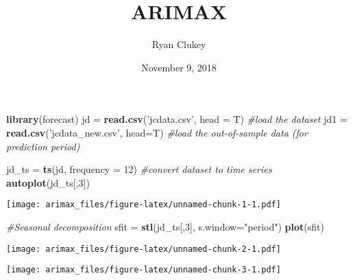 \documentclass[]{article}
\title{ARIMAX}
\author{Ryan Clukey}
\date{November 9, 2018}
\newenvironment{Shaded}{\begin{snugshade}}{\end{snugshade}}
\newcommand{\KeywordTok}[1]{\textcolor[rgb]{0.13,0.29,0.53}{\textbf{#1}}}
\newcommand{\DataTypeTok}[1]{\textcolor[rgb]{0.13,0.29,0.53}{#1}}
\newcommand{\DecValTok}[1]{\textcolor[rgb]{0.00,0.00,0.81}{#1}}
\newcommand{\StringTok}[1]{\textcolor[rgb]{0.31,0.60,0.02}{#1}}
\newcommand{\CommentTok}[1]{\textcolor[rgb]{0.56,0.35,0.01}{\textit{#1}}}
\newcommand{\OperatorTok}[1]{\textcolor[rgb]{0.81,0.36,0.00}{\textbf{#1}}}
\newcommand{\NormalTok}[1]{#1}
\begin{document}
\maketitle

\begin{Shaded}
\begin{Highlighting}[]
\KeywordTok{library}\NormalTok{(forecast)}
\NormalTok{jd =}\StringTok{ }\KeywordTok{read.csv}\NormalTok{(}\StringTok{'jcdata.csv'}\NormalTok{, }\DataTypeTok{head =}\NormalTok{ T)   }\CommentTok{#load the dataset}
\NormalTok{jd1 =}\StringTok{ }\KeywordTok{read.csv}\NormalTok{(}\StringTok{'jcdata_new.csv'}\NormalTok{, }\DataTypeTok{head=}\NormalTok{T)  }\CommentTok{#load the out-of-sample data (for prediction period)}

\NormalTok{jd_ts =}\StringTok{ }\KeywordTok{ts}\NormalTok{(jd, }\DataTypeTok{frequency =} \DecValTok{12}\NormalTok{)  }\CommentTok{#convert dataset to time series}
\KeywordTok{autoplot}\NormalTok{(jd_ts[,}\DecValTok{3}\NormalTok{])}
\end{Highlighting}
\end{Shaded}

\texttt{[image: arimax\_files/figure-latex/unnamed-chunk-1-1.pdf]}

\begin{Shaded}
\begin{Highlighting}[]
\CommentTok{#Seasonal decomposition}
\NormalTok{sfit =}\StringTok{ }\KeywordTok{stl}\NormalTok{(jd_ts[,}\DecValTok{3}\NormalTok{], }\DataTypeTok{s.window=}\StringTok{"period"}\NormalTok{)}
\KeywordTok{plot}\NormalTok{(sfit)}
\end{Highlighting}
\end{Shaded}

\texttt{[image: arimax\_files/figure-latex/unnamed-chunk-2-1.pdf]}

\begin{Shaded}
\end{Shaded}

\texttt{[image: arimax\_files/figure-latex/unnamed-chunk-3-1.pdf]}

\begin{Shaded}
\end{Shaded}
\end{document}
